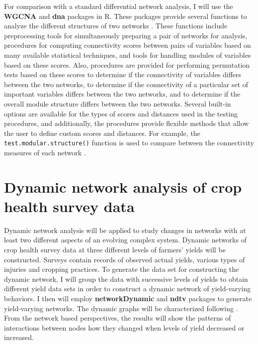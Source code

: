 For comparison with a standard differential network analysis, I will use the \textbf{WGCNA}  and \textbf{dna}  packages in \textsf{R}. These packages provide several functions to analyze the different structures of two networks . These functions include preprocessing tools for simultaneously preparing a pair of networks for analysis, procedures for computing connectivity scores between pairs of variables based on many available statistical techniques, and tools for handling modules of variables based on these scores. Also, procedures are provided for performing permutation tests based on these scores to determine if the connectivity of variables differs between the two networks, to determine if the connectivity of a particular set of important variables differs between the two networks, and to determine if the overall module structure differs between the two networks. Several built-in options are available for the types of scores and distances used in the testing procedures, and additionally, the procedures provide flexible methods that allow the user to define custom scores and distances. For example, the \texttt{test.modular.structure()} function is used to compare between the connectivity measures of each network .
 
\section*{Dynamic network analysis of crop health survey data}

Dynamic network analysis will be applied to study changes in networks with at least two different aspects of an evolving complex system. Dynamic networks of crop health survey data at three different levels of farmers' yields will be constructed. Surveys contain records of observed actual yields, various types of injuries and cropping practices. To generate the data set for constructing the dynamic network, I will group the data with successive levels of yields to obtain different yield data sets in order to construct a dynamic network of yield-varying behaviors. I then will employ \textbf{networkDynamic}  and \textbf{ndtv}  packages to generate yield-varying networks. The dynamic graphs will be characterized following . From the network based perspectives, the results will show the patterns of interactions between nodes how they changed when levels of yield decreased or increased.

